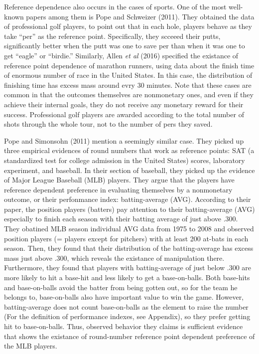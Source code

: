 \documentclass[dvipdfmx, 12pt]{article}
\begin{document}
\vspace{1zw}


Reference dependence also occurs in the cases of sports. One of the most well-known papers among them is Pope and Schweizer (2011). They obtained the data of professional golf players, to point out that in each hole, players behave as they take ``per'' as the reference point. Specifically, they scceeed their putts, significantly better when the putt was one to save per than when it was one to get ``eagle'' or ``birdie.'' Similarly, Allen \textit{et al} (2016) specified the existance of reference point dependence of marathon runners, using data about the finish time of enormous number of race in the United States. In this case, the distribution of finishing time has excess mass around evry 30 minutes. Note that these cases are common in that the outcomes themselves are nonmonetary ones, and even if they achieve their internal goals, they do not receive any monetary reward for their success. Professional golf players are awarded according to the total number of shots through the whole tour, not to the number of pers they saved.

Pope and Simonsohn (2011) mention a seemingly similar case. They picked up three empirical evidences of round numbers that work as reference points: SAT (a standardized test for college admission in the United States) scores, laboratory experiment, and baseball. In their section of baseball, they picked up the evidence of Major League Baseball (MLB) players. They argue that the players have reference dependent preference in evaluating themselves by a nonmonetary outcome, or their perfonmance index: batting-average (AVG). According to their paper, the position players (batters) pay attention to their batting-average (AVG) especially to finish each season with their batting average of just above .300. They obatined MLB season individual AVG data from 1975 to 2008 and observed position players (= players except for pitchers) with at least 200 at-bats in each season. Then, they found that their distribution of the batting-average has excess mass just above .300, which reveals the existance of manipulation there. Furthermore, they found that players with batting-average of just below .300 are more likely to hit a base-hit and less likely to get a base-on-balls. Both base-hits and base-on-balls avoid the batter from being gotten out, so for the team he belongs to, base-on-balls also have important value to win the game. However, batting-average does not count base-on-balls as the element to raise the number (For the definition of performance indexes, see Appendix), so they prefer getting hit to base-on-balls. Thus, observed behavior they claims is sufficient evidence that shows the existance of round-number reference point dependent preference of the MLB players.
\end{document}
